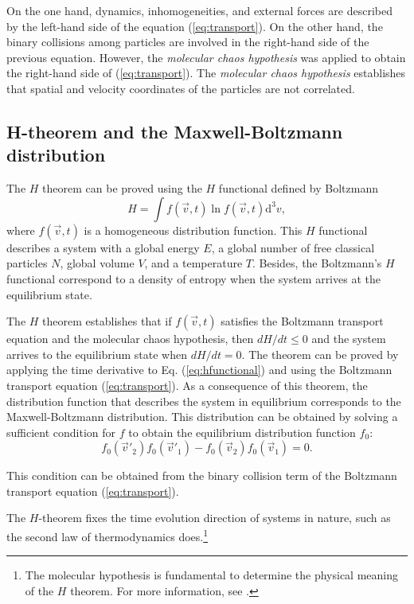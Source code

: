 On the one hand, dynamics, inhomogeneities, and external forces are described
by the left-hand side of the equation (\ref{eq:transport}). On the other hand, the
binary collisions among particles are involved in the right-hand side of the
previous equation. However, the \textit{molecular chaos hypothesis} was applied
to obtain the right-hand side of (\ref{eq:transport}). The \textit{molecular chaos
hypothesis} establishes that spatial and velocity coordinates of the particles
are not correlated.

\subsection{H-theorem and the Maxwell-Boltzmann distribution}
The $H$ theorem can be proved using the $H$ functional defined by Boltzmann 
%
\begin{equation}\label{eq:hfunctional}
   H=\int f(\vec{v},t) \ln f(\vec{v},t) \mathrm{d}^{3}v,
\end{equation} 
%
where $f(\vec{v},t)$ is a homogeneous distribution function.
This $H$ functional describes a system with a global energy $E$, a global
number of free classical particles $N$, global volume $V$, and a temperature $T$.
Besides, the Boltzmann's $H$ functional correspond to a density of entropy
when the system arrives at the equilibrium state.

The $H$ theorem establishes that if $f(\vec{v},t)$ satisfies the Boltzmann
transport equation and the molecular chaos hypothesis, then
$dH/dt\leq0$ and the system arrives to the equilibrium state when
$dH/dt=0$.
The theorem can be proved by applying the time derivative
to Eq. (\ref{eq:hfunctional}) and using the Boltzmann transport equation
(\ref{eq:transport}). As a consequence of this theorem, the distribution function
that describes the system in equilibrium corresponds to the Maxwell-Boltzmann
distribution. This distribution can be obtained by solving a sufficient
condition for $f$ to obtain the equilibrium distribution function $f_0$:
%
\begin{equation}
    f_0(\vec{v}'_2)f_0(\vec{v}'_1)- f_0(\vec{v}_2)f_0(\vec{v}_1)=0.
\end{equation}
%

This condition can be obtained from the binary collision term of the Boltzmann
transport equation (\ref{eq:transport}).

The $H$-theorem fixes the time evolution direction of systems in nature, such
as the second law of thermodynamics does.\footnote{The molecular hypothesis is %
fundamental to determine the physical meaning of the $H$ theorem. For more %
information, see \cite{bib:huang}.}

